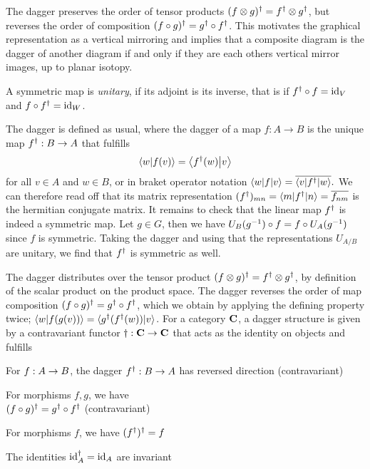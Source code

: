 The dagger preserves the order of tensor products $(f \otimes g)^\dagger = f^\dagger \otimes g^\dagger$, but reverses the order of composition $(f \circ g)^\dagger = g^\dagger \circ f^\dagger$.
%
This motivates the graphical representation as a vertical mirroring and implies that a composite diagram is the dagger of another diagram if and only if they are each others vertical mirror images, up to planar isotopy.

A symmetric map is \emph{unitary}, if its adjoint is its inverse, that is if $f^\dagger \circ f = \mathrm{id}_{V}$ and $f \circ f^\dagger = \mathrm{id}_{W}$.

\begin{doublecol}
    The dagger is defined as usual, where the dagger of a map $f: A \to B$ is the unique map $f^\dagger: B \to A$ that fulfills $$\braket{w}{f(v)} = \braket{\hconj{f}(w)}{v}$$ for all $v \in A$ and $w \in B$, or in braket operator notation $\braopket{w}{f}{v} = \conj{\braopket{v}{\hconj{f}}{w}}.$
    We can therefore read off that its matrix representation $(\hconj{f})_{mn} = \braopket{m}{\hconj{f}}{n} = \conj{f_{nm}}$ is the hermitian conjugate matrix.
    It remains to check that the linear map $f^\dagger$ is indeed a symmetric map. Let $g \in G$, then we have $U_B(g^{-1}) \circ f = f \circ U_A(g^{-1})$ since $f$ is symmetric.
    Taking the dagger and using that the representations $U_{A/B}$ are unitary, we find that $f^\dagger$ is symmetric as well.

    The dagger distributes over the tensor product $(f \otimes g)^\dagger = f^\dagger \otimes g^\dagger$, by definition of the scalar product on the product space.
    The dagger reverses the order of map composition $(f \circ g)^\dagger = g^\dagger \circ f^\dagger$, which we obtain by applying the defining property twice; $\braket{w}{f(g(v))} = \braket{\hconj{g}(\hconj{f}(w))}{v}$.
\colswitch
    For a category $\mathbf{C}$, a dagger structure is given by a contravariant functor $\dagger: \mathbf{C} \to \mathbf{C}$ that acts as the identity on objects and fulfills
    \begin{halfcolitemize}
        \item For $f: A \to B$, the dagger $f^\dagger: B \to A$ has reversed direction (contravariant)
        \item For morphisms $f, g$, we have\\$(f \circ g)^\dagger = g^\dagger \circ f^\dagger$ (contravariant)
        \item For morphisms $f$, we have $(f^\dagger)^\dagger = f$
        \item The identities $\mathrm{id}_{A}^\dagger = \mathrm{id}_{A}$ are invariant
    \end{halfcolitemize}
    

\end{doublecol}
